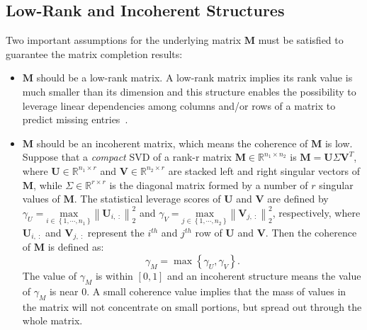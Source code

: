 \subsection{Low-Rank and Incoherent Structures}
Two important assumptions for the underlying matrix $\mathbf{M}$ must be satisfied to guarantee the matrix completion results:
\begin{itemize}
    \item 
    $\mathbf{M}$ should be a low-rank matrix. A low-rank matrix implies its rank value is much smaller than its dimension and this structure enables the possibility to leverage linear dependencies among columns and/or rows of a matrix to predict missing entries~\cite{ongie2018tensor}. 
    \item
    $\mathbf{M}$ should be an incoherent matrix, which means the coherence of $\mathbf{M}$ is low. Suppose that a \textit{compact} SVD of a rank-r matrix $\mathbf{M}\in \mathbb{R}^{n_1\times n_2}$ is $\mathbf{M} = \mathbf{U}\Sigma\mathbf{V}^T$, where $\mathbf{U} \in \mathbb{R}^{n_1\times r}$ and $\mathbf{V}\in \mathbb{R}^{n_2\times r}$ are stacked left and right singular vectors of $\mathbf{M}$, while $\Sigma \in \mathbb{R}^{r\times r}$ is the diagonal matrix formed by a number of $r$ singular values of $\mathbf{M}$. The statistical leverage scores of $\mathbf{U}$ and $\mathbf{V}$ are defined by $\gamma_{U} = \underset{i\in \left \{ 1, \cdots, n_1 \right \}}{\text{max}}\left \| \mathbf{U}_{i,~:} \right \|^2_2$ and $\gamma_{V} = \underset{j\in \left \{ 1, \cdots, n_2 \right \}}{\text{max}}\left \| \mathbf{V}_{j,~ :} \right \|^2_2$, respectively, where $\mathbf{U}_{i,~:}$ and $\mathbf{V}_{j,~:}$ represent the $i^{th}$ and $j^{th}$ row of $\mathbf{U}$ and $\mathbf{V}$. Then the coherence of $\mathbf{M}$ is defined as:
    \begin{equation}
        \label{eq:coherence}
        \gamma_{M} = \max \left \{ \gamma_{U}, \gamma_{V} \right \}.
    \end{equation}
    The value of $\gamma_M$ is within $\left [ 0, 1 \right ]$ and an incoherent structure means the value of $\gamma_M$ is near 0. A small coherence value implies that the mass of values in the matrix will not concentrate on small portions, but spread out through the whole matrix.
\end{itemize}


